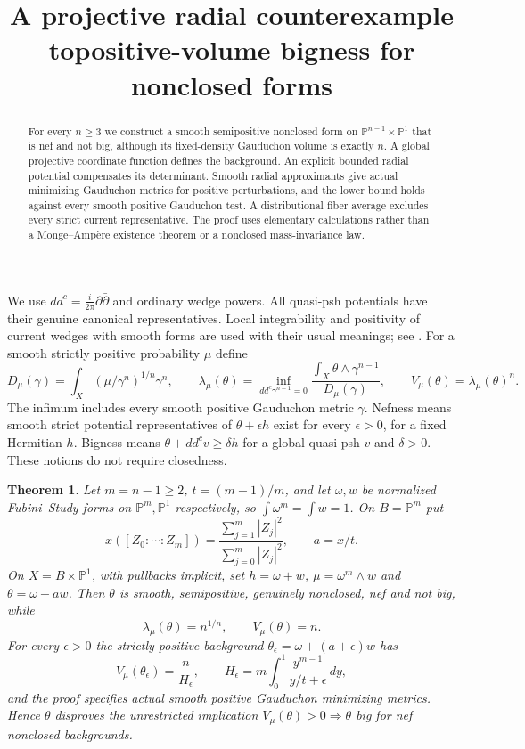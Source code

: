 \documentclass[11pt]{article}
\title{A projective radial counterexample to\newline positive-volume bigness for nonclosed forms}
\author{}
\date{}
\newcommand{\ddc}{dd^c}
\newtheorem{theorem}{Theorem}
\theoremstyle{remark}\newtheorem{remark}[theorem]{Remark}
\begin{document}
\maketitle
\begin{abstract}
For every $n\geq3$ we construct a smooth semipositive nonclosed form on
$\mathbb P^{n-1}\times\mathbb P^1$ that is nef and not big, although its
fixed-density Gauduchon volume is exactly $n$.
A global projective coordinate function defines the background. An explicit
bounded radial potential compensates its determinant. Smooth radial
approximants give actual minimizing Gauduchon metrics for positive
perturbations, and the lower bound holds against every smooth positive
Gauduchon test. A distributional fiber average excludes every strict
current representative. The proof uses elementary calculations rather
than a Monge--Amp\`ere existence theorem or a nonclosed mass-invariance law.
\end{abstract}

We use $\ddc=\frac{i}{2\pi}\partial\bar\partial$ and ordinary wedge
powers. All quasi-psh potentials have their genuine canonical representatives.
Local integrability and positivity of current wedges with smooth forms are
used with their usual meanings; see \cite[Chapters I and III]{Dem}.
For a smooth strictly positive probability $\mu$ define
\[
 D_\mu(\gamma)=\int_X(\mu/\gamma^n)^{1/n}\gamma^n,
 \qquad\lambda_\mu(\theta)=\inf_{\ddc\gamma^{n-1}=0}
 \frac{\int_X\theta\wedge\gamma^{n-1}}{D_\mu(\gamma)},
 \qquad V_\mu(\theta)=\lambda_\mu(\theta)^n.
\]
The infimum includes every smooth positive Gauduchon metric $\gamma$.
Nefness means smooth strict potential representatives of $\theta+\epsilon h$
exist for every $\epsilon>0$, for a fixed Hermitian $h$.
Bigness means $\theta+\ddc v\geq\delta h$ for a global quasi-psh $v$
and $\delta>0$. These notions do not require closedness.

\begin{theorem}\label{th:main}
Let $m=n-1\geq2$, $t=(m-1)/m$, and let $\omega,w$ be normalized
Fubini--Study forms on $\mathbb P^m,\mathbb P^1$ respectively, so
$\int\omega^m=\int w=1$.
On $B=\mathbb P^m$ put
\[
 x([Z_0:\cdots:Z_m])=
 \frac{\sum_{j=1}^m|Z_j|^2}{\sum_{j=0}^m|Z_j|^2},
 \qquad a=x/t.
\]
On $X=B\times\mathbb P^1$, with pullbacks implicit, set
$h=\omega+w$, $\mu=\omega^m\wedge w$ and $\theta=\omega+a w$.
Then $\theta$ is smooth, semipositive, genuinely nonclosed, nef and not big,
while
\[
 \lambda_\mu(\theta)=n^{1/n},\qquad V_\mu(\theta)=n.
\]
For every $\epsilon>0$ the strictly positive background
$\theta_\epsilon=\omega+(a+\epsilon)w$ has
\[
 V_\mu(\theta_\epsilon)=\frac{n}{H_\epsilon},\qquad
 H_\epsilon=m\int_0^1\frac{y^{m-1}}{y/t+\epsilon}\,dy,
\]
and the proof specifies actual smooth positive Gauduchon minimizing metrics.
Hence $\theta$ disproves the unrestricted implication
$V_\mu(\theta)>0\Rightarrow\theta$ big for nef nonclosed backgrounds.
\end{theorem}
\end{document}
